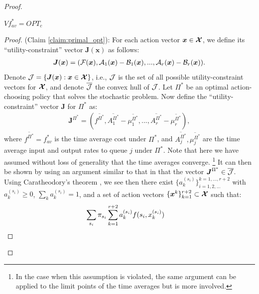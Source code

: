 \documentclass[journal]{IEEEtran}
\newcommand{\bv}[1]{{\boldsymbol{#1} }}
\newcommand{\script}[1]{{{\cal{#1} }}}
\begin{document}
\begin{proof}
\begin{claim}\label{claim:primal_opt}
$Vf^*_{av}=OPT_c$
\end{claim}
\begin{proof} (Claim \ref{claim:primal_opt}): 
For each action vector $\bv{x}\in\bv{\script{X}}$, we define its ``utility-constraint'' vector $\bv{J}(\bv{x})$ as follows: 
\begin{eqnarray*}
\bv{J}(\bv{x})=(\script{F}(\bv{x}), \script{A}_1(\bv{x})-\script{B}_1(\bv{x}), ..., \script{A}_r(\bv{x})-\script{B}_r(\bv{x})). 
\end{eqnarray*}
Denote $\script{J}=\{\bv{J}(\bv{x}): \bv{x}\in\bv{\script{X}}\}$, i.e., $\script{J}$ is the set of all possible utility-constraint vectors for $\bv{\script{X}}$, and denote $\overline{\script{J}}$ the convex hull of $\script{J}$. Let $\Pi^*$ be an optimal action-choosing policy that solves the stochastic problem.  Now define the ``utility-constraint'' vector $\bv{J}$ for $\Pi^*$ as: 
\begin{eqnarray*}
\bv{J}^{\Pi^*}=(\overline{f^{\Pi^*}}, \overline{A^{\Pi^*}_1}-\overline{\mu^{\Pi^*}_1}, ..., \overline{A^{\Pi^*}_r}-\overline{\mu^{\Pi^*}_r}), 
\end{eqnarray*}
where $\overline{f^{\Pi^*}}=f^*_{av}$ is the time average cost under $\Pi^*$, and $\overline{A^{\Pi^*}_j}, \overline{\mu^{\Pi^*}_j}$ are the time average input and output rates to queue $j$ under $\Pi^*$. Note that here we have assumed without loss of generality that the time averages converge. \footnote{ In the case when this assumption is violated, the same argument can be applied to the limit points of the time averages but is more involved.}
It can then be shown by using an argument similar to that in \cite{neelyenergy} that the vector $\bv{J}^{\Pi^*}\in\overline{\script{J}}$. Using Caratheodory's theorem \cite{bertsekasoptbook}, we see then there exist $\{a^{(s_i)}_k\}_{i=1, 2, ...}^{k=1,..., r+2}$ with $a^{(s_i)}_k\geq0$, $\sum_ka^{(s_i)}_k=1$, and a set of action vectors $\{\bv{x}^k\}_{k=1}^{r+2}\subset\bv{\script{X}}$ such that:
\begin{eqnarray*}
\hspace{-.3in}&& \sum_{s_i}\pi_{s_i}\sum_{k=1}^{r+2}a^{(s_i)}_kf(s_i, x^{(s_i)}_k) 

\end{eqnarray*}
\end{proof}
\end{proof}
\end{document}
